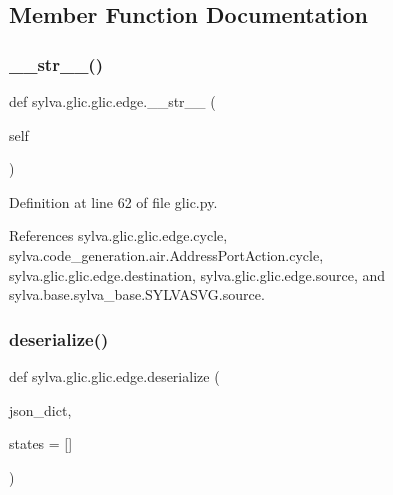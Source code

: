 \subsection{Member Function Documentation}
\mbox{\label{classsylva_1_1glic_1_1glic_1_1edge_a59d470622b60a6b3954eaad408779d2e}} 
\subsubsection{\texorpdfstring{\+\_\+\+\_\+str\+\_\+\+\_\+()}{\_\_str\_\_()}}
{\footnotesize\ttfamily def sylva.\+glic.\+glic.\+edge.\+\_\+\+\_\+str\+\_\+\+\_\+ (\begin{DoxyParamCaption}\item[{}]{self }\end{DoxyParamCaption})}



Definition at line 62 of file glic.\+py.



References sylva.\+glic.\+glic.\+edge.\+cycle, sylva.\+code\+\_\+generation.\+air.\+Address\+Port\+Action.\+cycle, sylva.\+glic.\+glic.\+edge.\+destination, sylva.\+glic.\+glic.\+edge.\+source, and sylva.\+base.\+sylva\+\_\+base.\+S\+Y\+L\+V\+A\+S\+V\+G.\+source.


\mbox{\label{classsylva_1_1glic_1_1glic_1_1edge_a1430a92ec5530e5c4dc8bd7109f356a7}} 
\subsubsection{\texorpdfstring{deserialize()}{deserialize()}}
{\footnotesize\ttfamily def sylva.\+glic.\+glic.\+edge.\+deserialize (\begin{DoxyParamCaption}\item[{}]{json\+\_\+dict,  }\item[{}]{states = {\ttfamily \mbox{[}\mbox{]}} }\end{DoxyParamCaption})\hspace{0.3cm}{\ttfamily [static]}}



